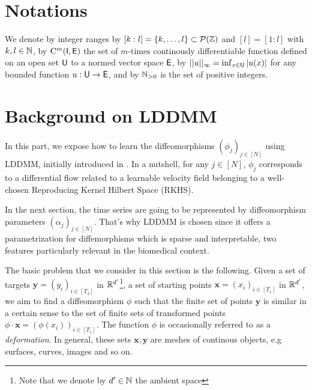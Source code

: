 \section{Notations}
We denote by integer ranges by $[k:l]=\{k,\ldots,l\}\subset \mathcal{P}(\mathbb{Z})$ and $ [l]=[1:l]$ with $k,l\in \mathbb{N}$,
by $\mathrm{C}^m(\mathsf{I},\mathsf{E})$ the set of $m$-times continously differentiable function defined on an open set $\mathsf{U}$ to a normed vector space $\mathsf{E}$,
 by $||u||_\infty=\inf_{x\in \mathsf{U}} |u(x)| $ for any bounded function $u:\mathsf{U} \to \mathsf{E}$,
and by $\mathbb{N}_{>0}$ is the set of positive integers. 

\section{Background on LDDMM}
\label{section:LDDMM}

In this part, we expose how to
 learn the diffeomorphisms $(\phi_j)_{j\in[N]}$ using LDDMM, initially introduced in \cite{beg2005computing}.
  In a nutshell, for any $j\in [N]$, $\phi_j$ corresponds to a differential flow related to a learnable velocity field belonging to a well-chosen Reproducing Kernel Hilbert Space (RKHS).

  In the next section, the time series are going to be represented by diffeomorphism parameters $(\alpha_j)_{j\in[N]}$.
  That's why LDDMM is chosen since it offers a parametrization for diffemorphisms which is sparse and interpretable, two features particularly relevant in the biomedical context.
 

The basic problem that we consider in this section is the following. Given a set of targets $\mathbf{y}=(y_i)_{i\in[T_2]}$ in $\mathbb{R}^{d'}$\footnote{Note that we denote by $d'\in\mathbb{N}$ the ambient space}, a set of starting points $\mathbf{x}=(x_{i})_{i\in[T_1]}$ in $\mathbb{R}^{d'}$, we aim to find a diffeomorphism $\phi$ such that the finite set of points $\mathbf{y}$ is similar in a certain sense to the set of finite sets of transformed points $\phi \cdot \mathbf{x} =(\phi(x_i))_{i\in[T_1]} $.
 The function $\phi$ is occasionally referred to as a \textit{deformation}. In general, these sets $\mathbf{x},\mathbf{y}$ are meshes of continous objects, e.g surfaces, curves, images and so on.

 
